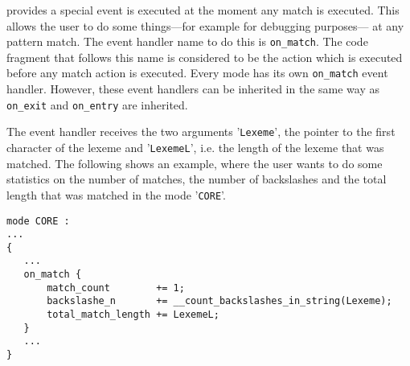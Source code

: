 {\Quex} provides a special event is executed at the moment any
match is executed. This allows the user to do some things---for 
example for debugging  purposes--- at any pattern match. The
event handler name to do this is {\tt on\_match}. The code
fragment that follows this name is considered to be the action
which is executed before any match action is executed. Every
mode has its own {\tt on\_match} event handler. However,
     these event handlers can be inherited in the same way
     as {\tt on\_exit} and {\tt on\_entry} are inherited.


The event handler receives the two arguments '{\tt Lexeme}', the pointer 
to the first character of the lexeme and
'{\tt LexemeL}', i.e. the length of the lexeme that was matched. The following shows
an example, where the user wants to do some statistics 
on the number of matches, the number of backslashes and the 
total length that was matched in the mode '{\tt CORE}'.

\begin{lstlisting}
mode CORE :
...
{
   ...
   on_match {
       match_count        += 1;
       backslashe_n       += __count_backslashes_in_string(Lexeme);
       total_match_length += LexemeL;
   }
   ...
} 
\end{lstlisting}
